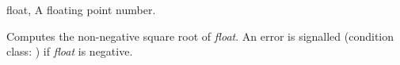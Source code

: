 \begin{optDefinition}
%
\begin{genericargs}
    \item[float, \classref{float}] A floating point number.
\end{genericargs}
%
\result%
Computes the non-negative square root of {\em float}.  An error is signalled
(condition class:
) if {\em float}
is negative.
%
\end{optDefinition}
